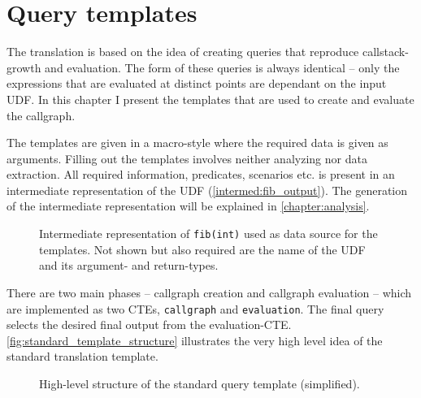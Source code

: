 \chapter{Query templates}\label{chapter:templates}



The translation is based on the idea of creating queries that reproduce callstack-growth and evaluation. The form of these queries is always identical -- only the expressions that are evaluated at distinct points are dependant on the input UDF. In this chapter I present the templates that are used to create and evaluate the callgraph.

The templates are given in a macro-style where the required data is given as arguments. Filling out the templates involves neither analyzing nor data extraction. All required information, predicates, scenarios etc. is present in an intermediate representation of the UDF (\autoref{intermed:fib_output}). The generation of the intermediate representation will be explained in \autoref{chapter:analysis}.

\begin{figure}[h!]
    \centering\small
    
    \caption{Intermediate representation of \texttt{fib(int)} used as data source for the templates. Not shown but also required are the name of the UDF and its argument- and return-types.}
    \label{intermed:fib_output}
\end{figure}



There are two main phases -- callgraph creation and callgraph evaluation -- which are implemented as two CTEs, \texttt{callgraph} and \texttt{evaluation}. The final query selects the desired final output from the evaluation-CTE. \autoref{fig:standard_template_structure} illustrates the very high level idea of the standard translation template.

\begin{figure}[h!]
    \centering
    \caption{High-level structure of the standard query template (simplified).}
    \label{fig:standard_template_structure}
\end{figure}

